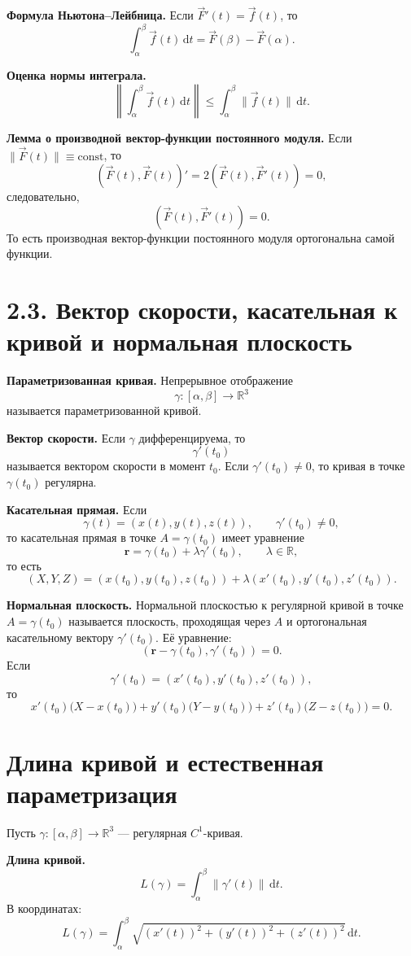 \documentclass[12pt,a4paper]{article}
\newcommand{\R}{\mathbb{R}}
\newcommand{\dd}{\,\mathrm{d}}
\newcommand{\vect}[1]{\mathbf{#1}}
\begin{document}
\textbf{Формула Ньютона--Лейбница.}
Если $\vec{F}'(t)=\vec{f}(t)$, то
\[
\int_\alpha^\beta \vec{f}(t)\dd t=\vec{F}(\beta)-\vec{F}(\alpha).
\]

\textbf{Оценка нормы интеграла.}
\[
\left\|\int_\alpha^\beta \vec{f}(t)\dd t\right\|
\le
\int_\alpha^\beta \|\vec{f}(t)\|\dd t.
\]

\textbf{Лемма о производной вектор-функции постоянного модуля.}
Если $\|\vec{F}(t)\|\equiv \mathrm{const}$, то
\[
(\vec{F}(t),\vec{F}(t))' = 2(\vec{F}(t),\vec{F}'(t))=0,
\]
следовательно,
\[
(\vec{F}(t),\vec{F}'(t))=0.
\]
То есть производная вектор-функции постоянного модуля ортогональна самой функции.

\section{2.3. Вектор скорости, касательная к кривой и нормальная плоскость}

\textbf{Параметризованная кривая.}
Непрерывное отображение
\[
\gamma:[\alpha,\beta]\to \R^3
\]
называется параметризованной кривой.

\textbf{Вектор скорости.}
Если $\gamma$ дифференцируема, то
\[
\gamma'(t_0)
\]
называется вектором скорости в момент $t_0$.
Если $\gamma'(t_0)\neq 0$, то кривая в точке $\gamma(t_0)$ регулярна.

\textbf{Касательная прямая.}
Если
\[
\gamma(t)=(x(t),y(t),z(t)),\qquad \gamma'(t_0)\neq 0,
\]
то касательная прямая в точке $A=\gamma(t_0)$ имеет уравнение
\[
\vect{r}=\gamma(t_0)+\lambda \gamma'(t_0),
\qquad \lambda\in \R,
\]
то есть
\[
(X,Y,Z)=(x(t_0),y(t_0),z(t_0))+\lambda(x'(t_0),y'(t_0),z'(t_0)).
\]

\textbf{Нормальная плоскость.}
Нормальной плоскостью к регулярной кривой в точке $A=\gamma(t_0)$ называется
плоскость, проходящая через $A$ и ортогональная касательному вектору
$\gamma'(t_0)$. Её уравнение:
\[
(\vect{r}-\gamma(t_0),\gamma'(t_0))=0.
\]
Если
\[
\gamma'(t_0)=(x'(t_0),y'(t_0),z'(t_0)),
\]
то
\[
x'(t_0)\bigl(X-x(t_0)\bigr)
+y'(t_0)\bigl(Y-y(t_0)\bigr)
+z'(t_0)\bigl(Z-z(t_0)\bigr)=0.
\]

\section{Длина кривой и естественная параметризация}

Пусть $\gamma:[\alpha,\beta]\to \R^3$ --- регулярная $C^1$-кривая.

\textbf{Длина кривой.}
\[
L(\gamma)=\int_\alpha^\beta \|\gamma'(t)\|\dd t.
\]
В координатах:
\[
L(\gamma)=\int_\alpha^\beta
\sqrt{(x'(t))^2+(y'(t))^2+(z'(t))^2}\dd t.
\]
\end{document}
